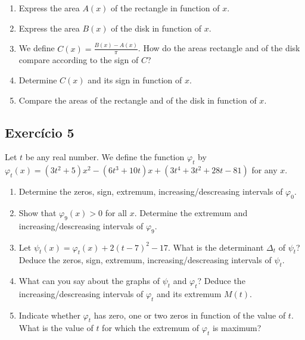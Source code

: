   \begin{center}
  \end{center}

  \begin{enumerate}
  \item Express the area $A(x)$ of the rectangle in function of $x$.
  \item Express the area $B(x)$ of the disk in function of $x$.
  \item We define $C(x) = \frac{B(x) - A(x)}{\pi}$. How do the areas
    rectangle and of the disk compare according to the sign of $C$?
  \item Determine $C(x)$ and its sign in function of $x$.
  \item Compare the areas of the rectangle and of the disk in function of $x$.
  \end{enumerate}    

\subsection*{Exercício 5}

Let $t$ be any real number. We define the function $\varphi_t$ by
$\varphi_t(x) = {(3t^2+5)}x^2-{(6t^3+10t)}x + {(3t^4+3t^2+28t-81)}$ for any $x$.
  
\begin{enumerate}
\item Determine the zeros, sign, extremum, increasing/descreasing intervals
  of $\varphi_0$.
\item Show that $\varphi_9(x) > 0$ for all $x$. Determine the extremum and
  increasing/descreasing intervals of $\varphi_9$.
\item Let $\psi_t(x) = \varphi_t(x) + 2(t-7)^2 - 17$. What is the determinant
  $\Delta_t$ of $\psi_t$? Deduce the zeros, sign, extremum,
  increasing/descreasing intervals of $\psi_t$.
\item What can you say about the graphs of $\psi_t$ and $\varphi_t$?
 Deduce the increasing/descreasing intervals of $\varphi_t$
 and its extremum $M(t)$.
\item Indicate whether $\varphi_t$ has zero, one or two zeros in function
  of the value of $t$. What is the value of $t$ for which the extremum of
  $\varphi_t$ is maximum?
\end{enumerate}

